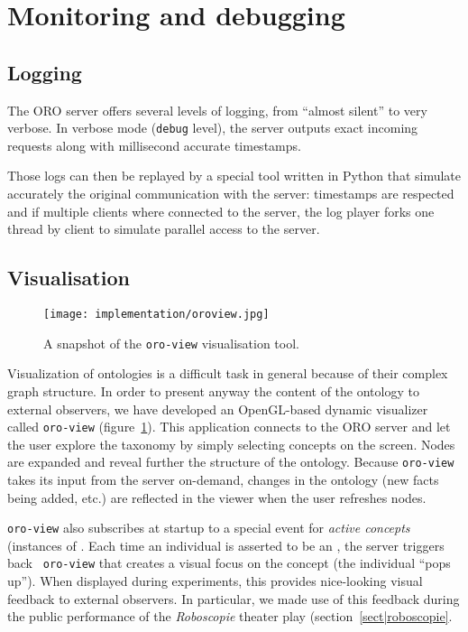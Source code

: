 \section{Monitoring and debugging}
\label{sect|monitoring}

\subsection{Logging}

The ORO server offers several levels of logging, from ``almost silent'' to very
verbose. In verbose mode ({\tt debug} level), the server outputs exact incoming
requests along with millisecond accurate timestamps.

Those logs can then be replayed by a special tool written in Python that
simulate accurately the original communication with the server: timestamps are
respected and if multiple clients where connected to the server, the log player
forks one thread by client to simulate parallel access to the server.

\subsection{Visualisation}

\begin{figure}
    \centering
    \texttt{[image: implementation/oroview.jpg]}
    \caption{A snapshot of the {\tt oro-view} visualisation tool.}
    \label{fig|oroview}
\end{figure}

Visualization of ontologies is a difficult task in general because of their
complex graph structure. In order to present anyway the content of the ontology
to external observers, we have developed an OpenGL-based dynamic visualizer
called {\tt oro-view} (figure~\ref{fig|oroview}). This application connects to
the ORO server and let the user explore the taxonomy by simply selecting
concepts on the screen. Nodes are expanded and reveal further the structure of
the ontology. Because {\tt oro-view} takes its input from the server on-demand,
changes in the ontology (new facts being added, etc.) are reflected in the
viewer when the user refreshes nodes.

{\tt oro-view} also subscribes at startup to a special event for \emph{active
concepts} (instances of . Each time an individual is
asserted to be an , the server triggers back {\tt
oro-view} that creates a visual focus on the concept (the individual ``pops
up''). When displayed during experiments, this provides nice-looking visual
feedback to external observers. In particular, we made use of this feedback
during the public performance of the \emph{Roboscopie} theater play
(section~\ref{sect|roboscopie}.

